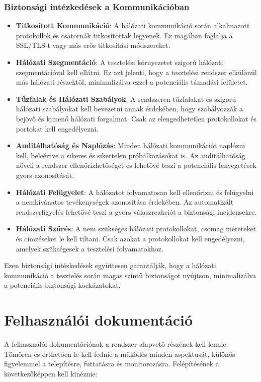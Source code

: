 \documentclass{scrreprt}
\begin{document}
\subsubsection{Biztonsági intézkedések a Kommunikációban}

\begin{itemize}
      \item \textbf{Titkosított Kommunikáció}:
            A hálózati kommunikáció során alkalmazott protokollok és csatornák titkosítottak legyenek. Ez magában foglalja a SSL/TLS-t vagy más erős titkosítási módszereket.
      \item \textbf{Hálózati Szegmentáció}:
            A tesztelési környezetet szigorú hálózati szegmentációval kell ellátni. Ez azt jelenti, hogy a tesztelési rendszer elkülönül más hálózati részektől, minimalizálva ezzel a potenciális támadási felületet.
      \item \textbf{Tűzfalak és Hálózati Szabályok}:
            A rendszeren tűzfalakat és szigorú hálózati szabályokat kell bevezetni annak érdekében, hogy szabályozzák a bejövő és kimenő hálózati forgalmat. Csak az elengedhetetlen protokollokat és portokat kell engedélyezni.
      \item \textbf{Auditálhatóság és Naplózás}:
            Minden hálózati kommunikációt naplózni kell, beleértve a sikeres és sikertelen próbálkozásokat is. Az auditálhatóság növeli a rendszer ellenőrizhetőségét és lehetővé teszi a potenciális fenyegetések gyors azonosítását.
      \item \textbf{Hálózati Felügyelet}:
            A hálózatot folyamatosan kell ellenőrizni és felügyelni a nemkívánatos tevékenységek azonosítása érdekében. Az automatizált rendszerfigyelés lehetővé teszi a gyors válaszreakciót a biztonsági incidensekre.
      \item \textbf{Hálózati Szűrés}:
            A nem szükséges hálózati protokollokat, csomag méreteket és címzéseket le kell tiltani. Csak azokat a protokollokat kell engedélyezni, amelyek szükségesek a tesztelési folyamatokhoz.
\end{itemize}

Ezen biztonsági intézkedések együttesen garantálják, hogy a hálózati kommunikáció a tesztelés során magas szintű biztonságot nyújtson, minimalizálva a
potenciális biztonsági kockázatokat.

\section{Felhasználói dokumentáció}
A felhasználói dokumentációnak a rendszer alapvető részének kell lennie. Tömören és érthetően le kell fednie a működés minden aspektusát, különös figyelemmel a
telepítésre, futtatásra és monitorozásra. Felépítésének a következőképpen kell kinéznie:
\end{document}
